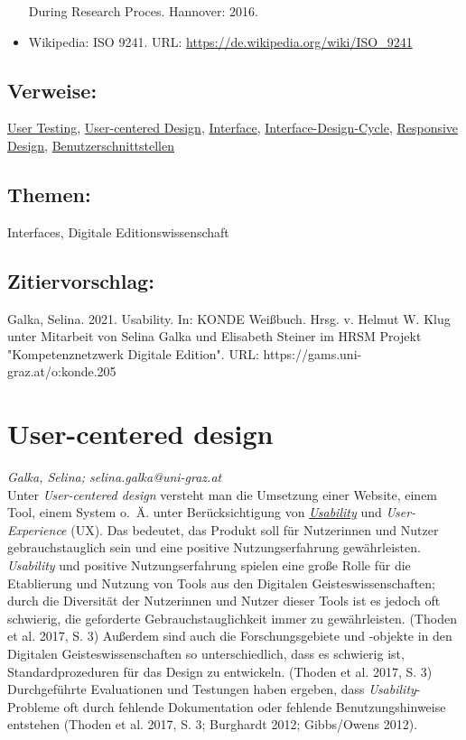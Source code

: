 \documentclass{article}
\begin{document}
\begin{itemize}
                              During Research Proces. Hannover: 2016.\item Wikipedia: ISO 9241. URL: \url{https://de.wikipedia.org/wiki/ISO_9241}\end{itemize}\subsection*{Verweise:}\href{https://gams.uni-graz.at/o:konde.206}{User Testing}, \href{https://gams.uni-graz.at/o:konde.207}{User-centered Design}, \href{https://gams.uni-graz.at/o:konde.98}{Interface}, \href{https://gams.uni-graz.at/o:konde.99}{Interface-Design-Cycle}, \href{https://gams.uni-graz.at/o:konde.164}{Responsive Design}, \href{https://gams.uni-graz.at/o:konde.18}{Benutzerschnittstellen}\subsection*{Themen:}Interfaces, Digitale Editionswissenschaft\subsection*{Zitiervorschlag:}Galka, Selina. 2021. Usability. In: KONDE Weißbuch. Hrsg. v. Helmut W. Klug unter Mitarbeit von Selina Galka und Elisabeth Steiner im HRSM Projekt "Kompetenznetzwerk Digitale Edition". URL: https://gams.uni-graz.at/o:konde.205\newpage\section*{User-centered design} \emph{Galka, Selina; selina.galka@uni-graz.at }\\
        
    Unter \emph{User-centered design} versteht man die Umsetzung einer Website, einem Tool, einem System o. Ä. unter Berücksichtigung von \emph{\href{http://gams.uni-graz.at/o:konde.205}{Usability}} und \emph{User-Experience} (UX). Das bedeutet, das Produkt soll für Nutzerinnen und Nutzer gebrauchstauglich sein und eine positive Nutzungserfahrung gewährleisten. \emph{Usability} und positive Nutzungserfahrung spielen eine große Rolle für die Etablierung und Nutzung von Tools aus den Digitalen Geisteswissenschaften; durch die Diversität der Nutzerinnen und Nutzer dieser Tools ist es jedoch oft schwierig, die geforderte Gebrauchstauglichkeit immer zu gewährleisten. (Thoden et al. 2017, S. 3) Außerdem sind auch die Forschungsgebiete und -objekte in den Digitalen Geisteswissenschaften so unterschiedlich, dass es schwierig ist, Standardprozeduren für das Design zu entwickeln. (Thoden et al. 2017, S. 3) Durchgeführte Evaluationen und Testungen haben ergeben, dass \emph{Usability}-Probleme oft durch fehlende  Dokumentation oder fehlende Benutzungshinweise entstehen (Thoden et al. 2017, S. 3; Burghardt 2012; Gibbs/Owens 2012).\\
            
\end{document}
